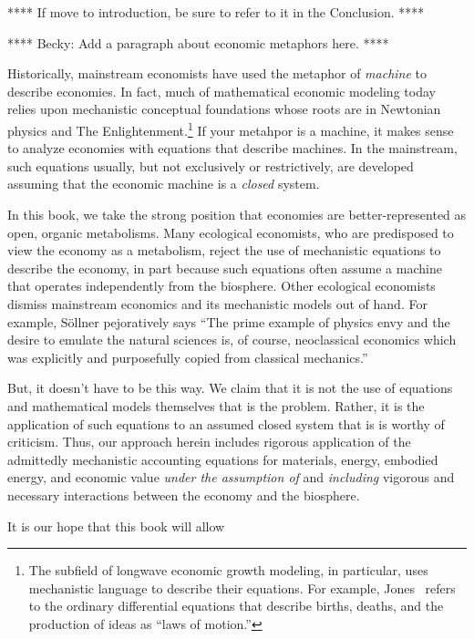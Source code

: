 **** If move to introduction, be sure to refer to it in the Conclusion. ****

**** Becky: Add a paragraph about economic metaphors here. ****

Historically, mainstream economists have used the metaphor of \emph{machine}
to describe economies. 
In fact, much of mathematical economic modeling today 
relies upon mechanistic conceptual foundations whose roots 
are in Newtonian physics 
and The Enlightenment.\footnote{The subfield 
of longwave economic growth modeling, in particular, 
uses mechanistic language to describe their equations. 
For example, Jones~\cite[pp. 6 \& 18]{Jones:2001wn} 
refers to the ordinary differential equations 
that describe births, deaths, and the production of ideas
as ``laws of motion.''}
If your metahpor is a machine, it makes sense to analyze economies
with equations that describe machines.
In the mainstream, such equations usually, but not exclusively or restrictively,
are developed assuming that the economic machine is a \emph{closed} system.

In this book, we take the strong position that economies are
better-represented as open, organic metabolisms.
Many ecological economists, 
who are predisposed to view the economy as a metabolism,
reject the use of mechanistic equations 
to describe the economy, in part because such equations often assume a 
machine that operates independently from the biosphere.
Other ecological economists dismiss mainstream economics 
and its mechanistic models out of hand. 
For example, S{\"o}llner pejoratively says 
``The prime example of physics envy and the desire 
to emulate the natural sciences is, of course, 
neoclassical economics which was explicitly and purposefully 
copied from classical mechanics.''~\cite[p. 178]{Sollner:1997wx}

But, it doesn't have to be this way.
We claim that it is not the use of equations 
and mathematical models themselves that is the problem.
Rather, it is the application of such equations 
to an assumed closed system
that is is worthy of criticism.
Thus, our approach herein includes rigorous application of the 
admittedly mechanistic accounting equations 
for materials, energy, embodied energy, and economic value
\emph{under the assumption of} and \emph{including} 
vigorous and necessary interactions between
the economy and the biosphere.

It is our hope that this book will allow

